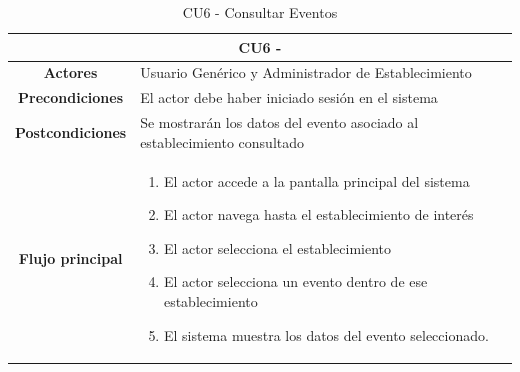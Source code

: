 \begin{table}[h]
    \centering
    \begin{tabular}{|c|p{10cm}|}
        \hline
        \multicolumn{2}{|c|}{\textbf{CU6 - }}                                                               \\
        \hline
        \textbf{Actores}         & Usuario Genérico y Administrador de Establecimiento                      \\
        \hline
        \textbf{Precondiciones}  & El actor debe haber iniciado sesión en el sistema                        \\
        \hline
        \textbf{Postcondiciones} & Se mostrarán los datos del evento asociado al establecimiento consultado \\
        \hline
        \textbf{Flujo principal} & \begin{enumerate}
                                       \item El actor accede a la pantalla principal del sistema
                                       \item El actor navega hasta el establecimiento de interés
                                       \item El actor selecciona el establecimiento
                                       \item El actor selecciona un evento dentro de ese establecimiento
                                       \item El sistema muestra los datos del evento seleccionado.
                                   \end{enumerate}         \\
        \hline
    \end{tabular}
    \caption{CU6 - Consultar Eventos }
\end{table}

